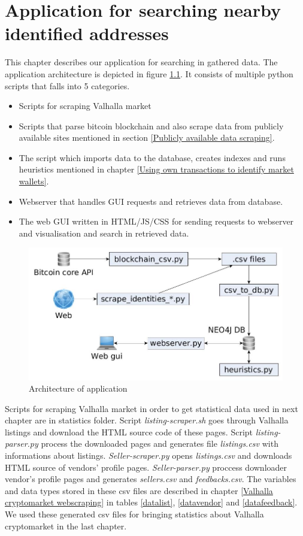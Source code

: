 \documentclass[
  digital, %
  table,   %
  lof,     %
  lot,     %
  oneside
]{fithesis3}
\begin{document}
\chapter{Application for searching nearby identified addresses}
\label{Application}

This chapter describes our application for searching in gathered data.
The application architecture is depicted in figure \ref{application_architecture}.
It consists of multiple python scripts that falls into 5 categories.

\begin{itemize}
 \item Scripts for scraping Valhalla market
 \item Scripts that parse bitcoin blockchain and also scrape data from publicly available sites mentioned in section \ref{Publicly available data scraping}.
 \item The script which imports data to the database, creates indexes and runs heuristics mentioned in chapter \ref{Using own transactions to identify market wallets}.
 \item Webserver that handles GUI requests and retrieves data from database.
 \item The web GUI written in HTML/JS/CSS for sending requests to webserver and visualisation and search in retrieved data. 
\end{itemize}


\begin{figure}[!htb]
    \centering
    \includegraphics[width=1\textwidth]{application_architecture}
    \caption{Architecture of application}
    \label{application_architecture}
\end{figure}

Scripts for scraping Valhalla market in order to get statistical data used in next chapter are in statistics folder.
Script \emph{listing-scraper.sh} goes through Valhalla listings and download the HTML source code of these pages.
Script \emph{listing-parser.py} process the downloaded pages and generates file \emph{listings.csv} with informations about listings.
\emph{Seller-scraper.py} opens \emph{listings.csv} and downloads HTML source of vendors' profile pages. 
\emph{Seller-parser.py} proccess downloader vendor's profile pages and generates \emph{sellers.csv} and \emph{feedbacks.csv}.
The variables and data types stored in these csv files are described in chapter \ref{Valhalla cryptomarket webscraping}
in tables \ref{datalist}, \ref{datavendor} and \ref{datafeedback}. We used these generated csv files for
bringing statistics about Valhalla cryptomarket in the last chapter.
\end{document}
